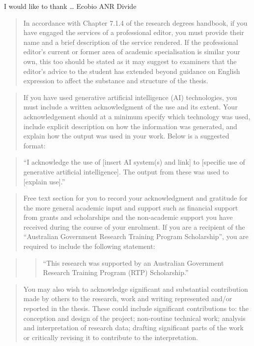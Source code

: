 \documentclass[
  11pt,
  a4paper,
]{report}
\begin{document}
I would like to thank \ldots{} Ecobio ANR Divide

\begin{quote}
In accordance with Chapter 7.1.4 of the research degrees handbook, if
you have engaged the services of a professional editor, you must provide
their name and a brief description of the service rendered. If the
professional editor's current or former area of academic specialisation
is similar your own, this too should be stated as it may suggest to
examiners that the editor's advice to the student has extended beyond
guidance on English expression to affect the substance and structure of
the thesis.
\end{quote}

\begin{quote}
If you have used generative artificial intelligence (AI) technologies,
you must include a written acknowledgment of the use and its extent.
Your acknowledgement should at a minimum specify which technology was
used, include explicit description on how the information was generated,
and explain how the output was used in your work. Below is a suggested
format:
\end{quote}

\begin{quote}
``I acknowledge the use of {[}insert AI system(s) and link{]} to
{[}specific use of generative artificial intelligence{]}. The output
from these was used to {[}explain use{]}.''
\end{quote}

\begin{quote}
Free text section for you to record your acknowledgment and gratitude
for the more general academic input and support such as financial
support from grants and scholarships and the non-academic support you
have received during the course of your enrolment. If you are a
recipient of the ``Australian Government Research Training Program
Scholarship'', you are required to include the following statement:
\end{quote}

\begin{quote}
\begin{quote}
``This research was supported by an Australian Government Research
Training Program (RTP) Scholarship.''
\end{quote}
\end{quote}

\begin{quote}
You may also wish to acknowledge significant and substantial
contribution made by others to the research, work and writing
represented and/or reported in the thesis. These could include
significant contributions to: the conception and design of the project;
non-routine technical work; analysis and interpretation of research
data; drafting significant parts of the work or critically revising it
to contribute to the interpretation.
\end{quote}
\end{document}
